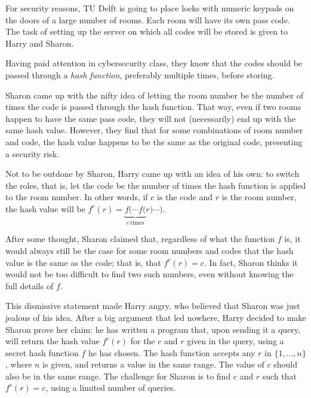 

\newcommand{\maxn}{2\cdot 10^5}
\newcommand{\maxq}{1000}

For security reasons, TU Delft is going to place locks with numeric keypads on the doors of a large number of rooms. Each room will have its own pass code. The task of setting up the server on which all codes will be stored is given to Harry and Sharon.

Having paid attention in cybersecurity class, they know that the codes should be passed through a \emph{hash function}, preferably multiple times, before storing.

Sharon came up with the nifty idea of letting the room number be the number of times the code is passed through the hash function. That way, even if two rooms happen to have the same pass code, they will not (necessarily) end up with the same hash value. However, they find that for some combinations of room number and code, the hash value happens to be the same as the original code, presenting a security risk.

Not to be outdone by Sharon, Harry came up with an idea of his own: to switch the roles, that is, let the code be the number of times the hash function is applied to the room number. In other words, if $c$ is the code and $r$ is the room number, the hash value will be $f^c(r) = \underbrace{f(\cdots f(}_{c~\mathrm{times}}r)\cdots)$.

After some thought, Sharon claimed that, regardless of what the function $f$ is, it would always still be the case for some room numbers and codes that the hash value is the same as the code; that is, that $f^c(r) = c$. In fact, Sharon thinks it would not be too difficult to find two such numbers, even without knowing the full details of $f$.

This dismissive statement made Harry angry, who believed that Sharon was just jealous of his idea. After a big argument that led nowhere, Harry decided to make Sharon prove her claim: he has written a program that, upon sending it a query, will return the hash value $f^c(r)$ for the $c$ and $r$ given in the query, using a secret hash function $f$ he has chosen. The hash function accepts any $r$ in $\{1,\dots,n\}$, where $n$ is given, and returns a value in the same range. The value of $c$ should also be in the same range. The challenge for Sharon is to find $c$ and $r$ such that $f^c(r) = c$, using a limited number of queries.

